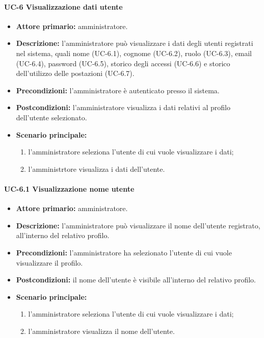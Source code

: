 \paragraph{UC-6 Visualizzazione dati utente}
\begin{itemize}
	\item \textbf{Attore primario:} amministratore.

	\item \textbf{Descrizione:} l'amministratore può visualizzare i dati degli utenti registrati nel sistema, quali nome (UC-6.1), cognome (UC-6.2), ruolo (UC-6.3), email (UC-6.4), password (UC-6.5), storico degli accessi (UC-6.6) e storico dell'utilizzo delle postazioni (UC-6.7).
	
	\item \textbf{Precondizioni:} l'amministratore è autenticato presso il sistema.

	\item \textbf{Postcondizioni:} l'amministratore visualizza i dati relativi al profilo dell'utente selezionato.

	\item \textbf{Scenario principale:}
	\begin{enumerate}
    	\item  l'amministratore seleziona l'utente di cui vuole visualizzare i dati;
    	\item  l'amministrtore visualizza i dati dell'utente.
	\end{enumerate}
\end{itemize}

    \paragraph{UC-6.1 Visualizzazione nome utente}
    \begin{itemize}
        \item \textbf{Attore primario:} amministratore.
        
        \item \textbf{Descrizione:} l'amministratore può visualizzare il nome dell'utente registrato, all'interno del relativo profilo.
        
        \item \textbf{Precondizioni:} l'amministratore ha selezionato l'utente di cui vuole visualizzare il profilo.
    
        \item \textbf{Postcondizioni:} il nome dell'utente è visibile all'interno del relativo profilo.
    
        \item \textbf{Scenario principale:}
        \begin{enumerate}
            \item  l'amministratore seleziona l'utente di cui vuole visualizzare i dati;
            \item  l'amministratore visualizza il nome dell'utente.
        \end{enumerate}
    \end{itemize}

